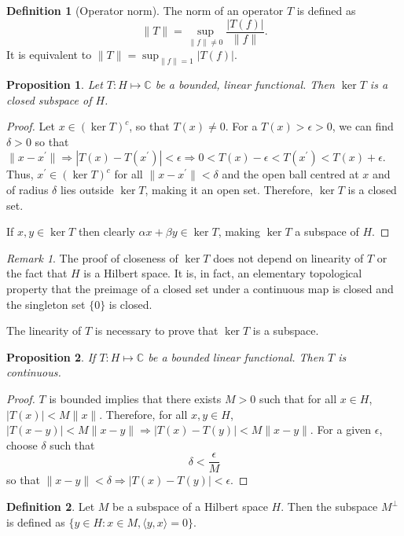 \documentclass{article}
\theoremstyle{plain}
\numberwithin{thm}{section}
\theoremstyle{plain}
\newtheorem{prop}{Proposition}
\numberwithin{prop}{section}
\theoremstyle{definition}
\newtheorem{defn}{Definition}
\numberwithin{defn}{section}
\theoremstyle{remark}
\newtheorem*{rem}{Remark}
\numberwithin{equation}{section}
\begin{document}
\begin{defn}[Operator norm]\label{s4d6}
The norm of an operator $T$ is defined as 
\[
\lVert T \rVert = \sup_{\lVert f \rVert \ne 0}\frac{|T(f)|}{\lVert f \rVert}.
\]
It is equivalent to $\lVert T \rVert = \sup_{\lVert f \rVert = 1}|T(f)|.$
\end{defn}

\begin{prop}\label{s4p2}
Let $T: H \mapsto \mathbb{C}$ be a bounded, linear functional. Then $\ker T$
is a closed subspace of $H$.
\end{prop}
\begin{proof}
Let $x \in (\ker T)^c$, so that $T(x) \ne 0$. For a $T(x) > \epsilon > 0$,
we can find $\delta > 0$ so that $\lVert x - x^\prime\rVert \Rightarrow |T(x)
- T(x^\prime)| < \epsilon \Rightarrow 0 < T(x) - \epsilon < T(x^\prime) < T(x) + 
\epsilon$. Thus, $x^\prime \in (\ker T)^c$ for all $\lVert x - x^\prime\rVert <
\delta$ and the open ball centred at $x$ and of radius $\delta$ lies outside
$\ker T$, making it an open set. Therefore, $\ker T$ is a closed set.

If $x, y \in \ker T$ then clearly $\alpha x + \beta y \in \ker T$, making 
$\ker T$ a subspace of $H$.
\end{proof}
\begin{rem}
The proof of closeness of $\ker T$ does not depend on linearity of $T$ or the
fact that $H$ is a Hilbert space. It is, in fact, an elementary topological 
property that the preimage of a closed set under a continuous map is closed and
the singleton set $\{0\}$ is closed.

The linearity of $T$ is necessary to prove that $\ker T$ is a subspace.
\end{rem}

\begin{prop}\label{s4p3}
If $T: H \mapsto \mathbb{C}$ be a bounded linear functional. Then $T$ is 
continuous.
\end{prop}
\begin{proof}
$T$ is bounded implies that there exists $M > 0$ such that for all $x \in H$,
$|T(x)| < M\lVert x \rVert$. Therefore, for all $x, y \in H$, $|T(x - y)| < 
M\lVert x - y \rVert \Rightarrow |T(x) - T(y)| < M\lVert x - y \rVert$. For
a given $\epsilon$, choose $\delta$ such that 
\[
\delta < \frac{\epsilon}{M}
\]
so that $\lVert x - y \rVert < \delta \Rightarrow |T(x) - T(y)| < \epsilon$.
\end{proof}

\begin{defn}\label{s4d7}
Let $M$ be a subspace of a Hilbert space $H$. Then the subspace $M^\perp$ is
defined as $\{y \in H: x \in M, \langle y, x\rangle = 0\}$.
\end{defn}
\end{document}
